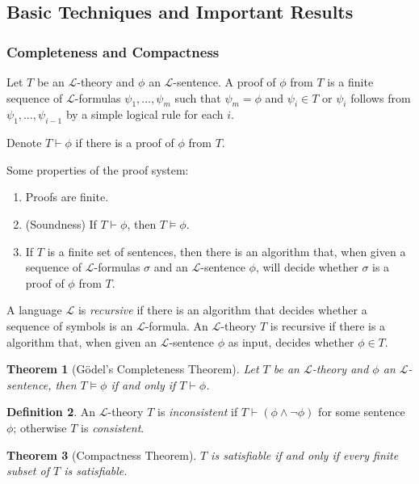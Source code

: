 \documentclass{amsart}
\newtheorem{theorem}{Theorem}[section]
\theoremstyle{definition}
\newtheorem{definition}[theorem]{Definition}
\numberwithin{equation}{section}
\begin{document}
\subsection{Basic Techniques and Important Results}
\subsubsection{Completeness and Compactness}
Let $T$ be an $\mathcal{L}$-theory and $\phi$ an $\mathcal{L}$-sentence.
A proof of $\phi$ from $T$ is a finite sequence of $\mathcal{L}$-formulas
$\psi_1,\dots,\psi_m$ such that $\psi_m = \phi$ and $\psi_i \in T$ or 
$\psi_i$ follows from $\psi_1,\dots,\psi_{i-1}$ by a simple logical rule for each $i$.

Denote $T \vdash \phi$ if there is a proof of $\phi$ from $T$.

Some properties of the proof system:
\begin{enumerate}[label = {$\bullet$}]
    \item Proofs are finite.
    \item (Soundness) If $T \vdash \phi$, then $T \models \phi$.
    \item If $T$ is a finite set of sentences, then there is an algorithm that, when given a sequence of $\mathcal{L}$-formulas $\sigma$ and an $\mathcal{L}$-sentence $\phi$, will decide whether $\sigma$ is a proof of $\phi$ from $T$.
\end{enumerate}

A language $\mathcal{L}$ is \emph{recursive} if there is an algorithm that decides whether a sequence of symbols is an $\mathcal{L}$-formula.
An $\mathcal{L}$-theory $T$ is recursive if there is a algorithm that,
when given an $\mathcal{L}$-sentence $\phi$ as input, decides whether $\phi \in T$.

\begin{theorem}[G\"odel's Completeness Theorem]
    Let $T$ be an $\mathcal{L}$-theory and $\phi$ an $\mathcal{L}$-sentence, then $T \models \phi$ if and only if $T\vdash \phi$.
\end{theorem}

\begin{definition}
    An $\mathcal{L}$-theory $T$ is \emph{inconsistent} 
    if $T \vdash (\phi \land\neg\phi)$ for some sentence $\phi$;
    otherwise $T$ is \emph{consistent}.
\end{definition}

\begin{theorem}[Compactness Theorem]
    $T$ is satisfiable if and only if every finite subset of $T$ is satisfiable.
\end{theorem}
\end{document}
